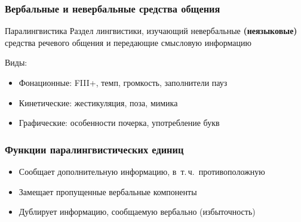 \begin{frame}
  \frametitle{Вербальные и невербальные средства общения}

  \begin{block}{Паралингвистика}
    Раздел лингвистики, изучающий невербальные \textbf{(неязыковые)} средства речевого общения и передающие смысловую информацию
  \end{block}

  \vfill

  Виды: \begin{itemize}
    \item Фонационные: FIII+, темп, громкость, заполнители пауз
    \item Кинетические: жестикуляция, поза, мимика
    \item Графические: особенности почерка, употребление букв
  \end{itemize}
\end{frame}

\begin{frame}
  \frametitle{Функции паралингвистических единиц}

  \begin{itemize}
    \item Сообщает дополнительную информацию, в~т.\,ч.\ противоположную
    \item Замещает пропущенные вербальные компоненты
    \item Дублирует информацию, сообщаемую вербально (избыточность)
  \end{itemize}
\end{frame}

